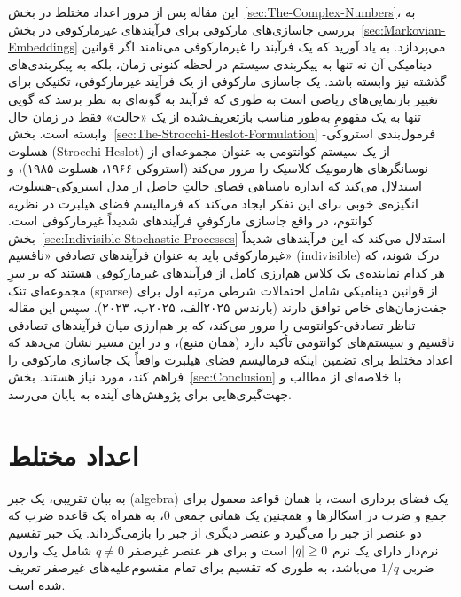 \documentclass{article}
\begin{document}
این مقاله پس از مرور اعداد مختلط در بخش~\ref{sec:The-Complex-Numbers}، به بررسی جاسازی‌های مارکوفی برای فرآیندهای غیرمارکوفی در بخش~\ref{sec:Markovian-Embeddings} می‌پردازد. به یاد آورید که یک فرآیند را غیرمارکوفی می‌نامند اگر قوانین دینامیکی آن نه تنها به پیکربندی سیستم در لحظه کنونی زمان، بلکه به پیکربندی‌های گذشته نیز وابسته باشد. یک جاسازی مارکوفی از یک فرآیند غیرمارکوفی، تکنیکی برای تغییر بازنمایی‌های ریاضی است به طوری که فرآیند به گونه‌ای به نظر برسد که گویی تنها به یک مفهومِ به‌طور مناسب بازتعریف‌شده از یک «حالت» فقط در زمان حال وابسته است. بخش~\ref{sec:The-Strocchi-Heslot-Formulation} فرمول‌بندی استروکی-هسلوت (Strocchi-Heslot) از یک سیستم کوانتومی به عنوان مجموعه‌ای از نوسانگرهای هارمونیک کلاسیک را مرور می‌کند (استروکی ۱۹۶۶، هسلوت ۱۹۸۵)\nocite{Strocchi:1966ccqm,Heslot:1985qmaact}، و استدلال می‌کند که اندازه نامتناهی فضای حالتِ حاصل از مدل استروکی-هسلوت، انگیزه‌ی خوبی برای این تفکر ایجاد می‌کند که فرمالیسم فضای هیلبرت در نظریه کوانتوم، در واقع جاسازی مارکوفیِ فرآیندهای شدیداً غیرمارکوفی است. بخش~\ref{sec:Indivisible-Stochastic-Processes} استدلال می‌کند که این فرآیندهای شدیداً غیرمارکوفی باید به عنوان فرآیندهای تصادفی «ناقسیم» (indivisible) درک شوند، که هر کدام نماینده‌ی یک کلاس هم‌ارزی کامل از فرآیندهای غیرمارکوفی هستند که بر سرِ مجموعه‌ای تنک (sparse) از قوانین دینامیکی شامل احتمالات شرطی مرتبه اول برای جفت‌زمان‌های خاص توافق دارند (بارندس ۲۰۲۵الف، ۲۰۲۵ب، ۲۰۲۳)\nocite{Barandes:2025tsqc,Barandes:2025qsaisp,Barandes:2023tsqt}. سپس این مقاله تناظر تصادفی-کوانتومی را مرور می‌کند، که بر هم‌ارزی میان فرآیندهای تصادفی ناقسیم و سیستم‌های کوانتومی تأکید دارد (همان منبع)، و در این مسیر نشان می‌دهد که اعداد مختلط برای تضمین اینکه فرمالیسم فضای هیلبرت واقعاً یک جاسازی مارکوفی را فراهم کند، مورد نیاز هستند. بخش~\ref{sec:Conclusion} با خلاصه‌ای از مطالب و جهت‌گیری‌هایی برای پژوهش‌های آینده به پایان می‌رسد.

\section{اعداد مختلط\label{sec:The-Complex-Numbers}}

به بیان تقریبی، یک جبر (algebra) یک فضای برداری است، با همان قواعد معمول برای جمع و ضرب در اسکالرها و همچنین یک همانی جمعی $0$، به همراه یک قاعده ضرب که دو عنصر از جبر را می‌گیرد و عنصر دیگری از جبر را بازمی‌گرداند. یک جبر تقسیم نرم‌دار  دارای یک نرم $\vert q\vert\geq0$ است و برای هر عنصر غیرصفر $q\ne0$ شامل یک وارون ضربی $1/q$ می‌باشد، به طوری که تقسیم برای تمام مقسوم‌علیه‌های غیرصفر تعریف شده است.
\end{document}
